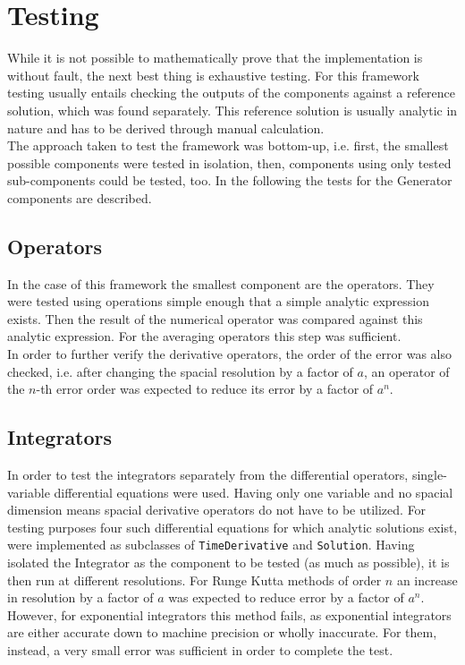 \section{Testing}\label{sec:testing}
While it is not possible to mathematically prove that the implementation is without fault, the next best thing is exhaustive testing.
For this framework testing usually entails checking the outputs of the components against a reference solution, which was found separately.
This reference solution is usually analytic in nature and has to be derived through manual calculation.
\\
The approach taken to test the framework was bottom-up, i.e. first, the smallest possible components were tested in isolation, then, components using only tested sub-components could be tested, too.
In the following the tests for the Generator components are described.

\subsection{Operators}
In the case of this framework the smallest component are the operators.
They were tested using operations simple enough that a simple analytic expression exists.
Then the result of the numerical operator was compared against this analytic expression.
For the averaging operators this step was sufficient.
\\
In order to further verify the derivative operators, the order of the error was also checked, i.e. after changing the spacial resolution by a factor of $a$, an operator of the $n$-th error order was expected to reduce its error by a factor of $a^n$.

\subsection{Integrators}
In order to test the integrators separately from the differential operators, single-variable differential equations were used.
Having only one variable and no spacial dimension means spacial derivative operators do not have to be utilized.
For testing purposes four such differential equations for which analytic solutions exist, were implemented as subclasses of  \texttt{TimeDerivative} and \texttt{Solution}.
Having isolated the Integrator as the component to be tested (as much as possible), it is then run at different resolutions.
For Runge Kutta methods of order $n$ an increase in resolution by a factor of $a$ was expected to reduce error by a factor of $a^n$.
However, for exponential integrators this method fails, as exponential integrators are either accurate down to machine precision or wholly inaccurate.
For them, instead, a very small error was sufficient in order to complete the test.

